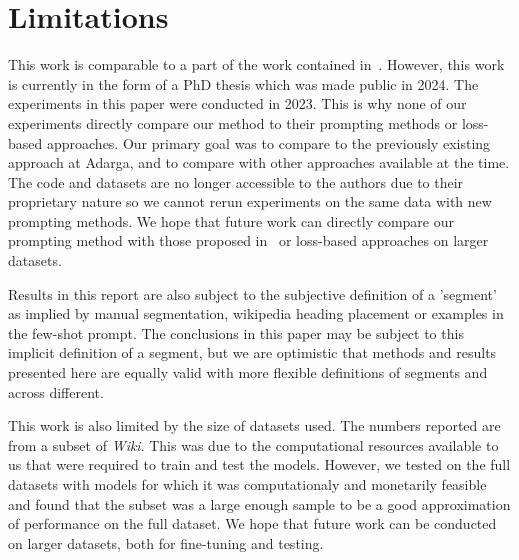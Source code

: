 \section*{Limitations}

This work is comparable to a part of the work contained in~\cite{XingThesis}. However, this work is currently in the form of a PhD thesis which was made public in 2024. The experiments in this paper were conducted in 2023. This is why none of our experiments directly compare our method to their prompting methods or loss-based approaches. Our primary goal was to compare to the previously existing approach at Adarga, and to compare with other approaches available at the time. The code and datasets are no longer accessible to the authors due to their proprietary nature so we cannot rerun experiments on the same data with new prompting methods. We hope that future work can directly compare our prompting method with those proposed in~\cite{XingThesis} or loss-based approaches on larger datasets.

Results in this report are also subject to the subjective definition of a 'segment' as implied by manual segmentation, wikipedia heading placement or examples in the few-shot prompt. The conclusions in this paper may be subject to this implicit definition of a segment, but we are optimistic that methods and results presented here are equally valid with more flexible definitions of segments and across different.

This work is also limited by the size of datasets used. The numbers reported are from a subset of \emph{Wiki}. This was due to the computational resources available to us that were required to train and test the models. However, we tested on the full datasets with models for which it was computationaly and monetarily feasible and found that the subset was a large enough sample to be a good approximation of performance on the full dataset. We hope that future work can be conducted on larger datasets, both for fine-tuning and testing.